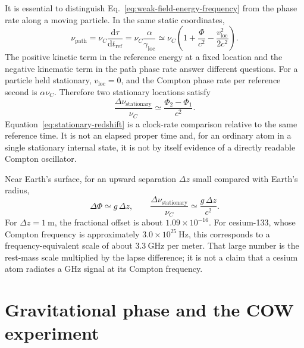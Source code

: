 \documentclass[12pt]{article}
\begin{document}
It is essential to distinguish Eq.~\eqref{eq:weak-field-energy-frequency} from the phase rate along a moving particle. In the same static coordinates,
\begin{equation}
  \nu_{\mathrm{path}}=\nu_C\frac{\mathrm{d}\tau}{\mathrm{d}t_{\mathrm{ref}}}
  =\nu_C\frac{\alpha}{\gamma_{\mathrm{loc}}}
  \simeq\nu_C\left(1+\frac{\Phi}{c^2}
                    -\frac{v_{\mathrm{loc}}^2}{2c^2}\right).
  \label{eq:weak-field-path-rate}
\end{equation}
The positive kinetic term in the reference energy at a fixed location and the negative kinematic term in the path phase rate answer different questions. For a particle held stationary, $v_{\mathrm{loc}}=0$, and the Compton phase rate per reference second is $\alpha\nu_C$. Therefore two stationary locations satisfy
\begin{equation}
  \frac{\Delta\nu_{\mathrm{stationary}}}{\nu_C}
  \simeq\frac{\Phi_2-\Phi_1}{c^2}.
  \label{eq:stationary-redshift}
\end{equation}
Equation~\eqref{eq:stationary-redshift} is a clock-rate comparison relative to the same reference time. It is not an elapsed proper time and, for an ordinary atom in a single stationary internal state, it is not by itself evidence of a directly readable Compton oscillator.

Near Earth's surface, for an upward separation $\Delta z$ small compared with Earth's radius,
\begin{equation}
  \Delta\Phi\simeq g\,\Delta z,
  \qquad
  \frac{\Delta\nu_{\mathrm{stationary}}}{\nu_C}
  \simeq\frac{g\,\Delta z}{c^2}.
  \label{eq:near-earth-redshift}
\end{equation}
For $\Delta z=1\ \mathrm{m}$, the fractional offset is about $1.09\times10^{-16}$. For cesium-133, whose Compton frequency is approximately $3.0\times10^{25}\ \mathrm{Hz}$, this corresponds to a frequency-equivalent scale of about $3.3\ \mathrm{GHz}$ per meter. That large number is the rest-mass scale multiplied by the lapse difference; it is not a claim that a cesium atom radiates a GHz signal at its Compton frequency.

\section{Gravitational phase and the COW experiment}
\end{document}
